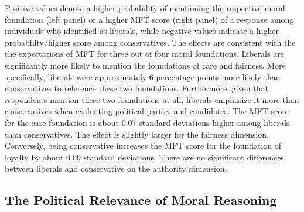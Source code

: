 \documentclass[12pt]{article}
\begin{document}
Positive values denote a higher probability of mentioning the respective moral foundation (left panel) or a higher MFT score (right panel) of a response among individuals who identified as liberals, while negative values indicate a higher probability/higher score among conservatives. The effects are consistent with the the expectations of MFT for three out of four moral foundations. Liberals are significantly more likely to mention the foundations of care and fairness. More specifically, liberals were approximately 6 percentage points more likely than conservatives to reference these two foundations. Furthermore, given that respondents mention these two foundations at all, liberals emphasize it more than conservatives when evaluating political parties and candidates. The MFT score for the care foundation is about 0.07 standard deviations higher among liberals than conservatives. The effect is slightly larger for the fairness dimension. Conversely, being conservative increases the MFT score for the foundation of loyalty by about 0.09 standard deviations. There are no significant differences between liberals and conservative on the authority dimension.



\subsection*{The Political Relevance of Moral Reasoning}
\end{document}
